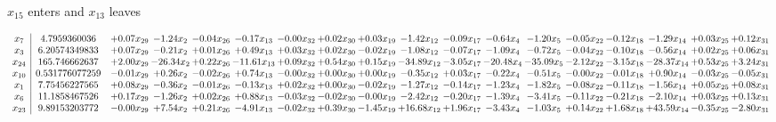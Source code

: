\documentclass[9pt]{article}
\begin{document}
 $ x_{15} $ enters and $ x_{13} $ leaves 

 \[\begin{array}{c| c c@{\hskip 2pt} c@{\hskip 2pt} c@{\hskip 2pt} c@{\hskip 2pt} c@{\hskip 2pt} c@{\hskip 2pt} c@{\hskip 2pt} c@{\hskip 2pt} c@{\hskip 2pt} c@{\hskip 2pt} c@{\hskip 2pt} c@{\hskip 2pt} c@{\hskip 2pt} c@{\hskip 2pt} c@{\hskip 2pt} c@{\hskip 2pt} }
 x_{7}   &  4.7959360036 & +  0.07 x_{29} & -1.24 x_{2} & -0.04 x_{26} & -0.17 x_{13} & -0.00 x_{32} & +  0.02 x_{30} & +  0.03 x_{19} & -1.42 x_{12} & -0.09 x_{17} & -0.64 x_{4} & -1.20 x_{5} & -0.05 x_{22} & -0.12 x_{18} & -1.29 x_{14} & +  0.03 x_{25} & +  0.12 x_{31}\\
 x_{3}   &  6.20574349833 & +  0.07 x_{29} & -0.21 x_{2} & +  0.01 x_{26} & +  0.49 x_{13} & +  0.03 x_{32} & +  0.02 x_{30} & -0.02 x_{19} & -1.08 x_{12} & -0.07 x_{17} & -1.09 x_{4} & -0.72 x_{5} & -0.04 x_{22} & -0.10 x_{18} & -0.56 x_{14} & +  0.02 x_{25} & +  0.06 x_{31}\\
 x_{24}   &  165.746662637 & +  2.00 x_{29} & -26.34 x_{2} & +  0.22 x_{26} & -11.61 x_{13} & +  0.09 x_{32} & +  0.54 x_{30} & +  0.15 x_{19} & -34.89 x_{12} & -3.05 x_{17} & -20.48 x_{4} & -35.09 x_{5} & -2.12 x_{22} & -3.15 x_{18} & -28.37 x_{14} & +  0.53 x_{25} & +  3.24 x_{31}\\
 x_{10}   &  0.531776077259 & -0.01 x_{29} & +  0.26 x_{2} & -0.02 x_{26} & +  0.74 x_{13} & -0.00 x_{32} & +  0.00 x_{30} & +  0.00 x_{19} & -0.35 x_{12} & +  0.03 x_{17} & -0.22 x_{4} & -0.51 x_{5} & -0.00 x_{22} & -0.01 x_{18} & +  0.90 x_{14} & -0.03 x_{25} & -0.05 x_{31}\\
 x_{1}   &  7.75456227565 & +  0.08 x_{29} & -0.36 x_{2} & -0.01 x_{26} & -0.13 x_{13} & +  0.02 x_{32} & +  0.00 x_{30} & -0.02 x_{19} & -1.27 x_{12} & -0.14 x_{17} & -1.23 x_{4} & -1.82 x_{5} & -0.08 x_{22} & -0.11 x_{18} & -1.56 x_{14} & +  0.05 x_{25} & +  0.08 x_{31}\\
 x_{6}   &  11.1858467526 & +  0.17 x_{29} & -1.26 x_{2} & +  0.02 x_{26} & +  0.88 x_{13} & -0.03 x_{32} & -0.02 x_{30} & -0.00 x_{19} & -2.42 x_{12} & -0.20 x_{17} & -1.39 x_{4} & -3.41 x_{5} & -0.11 x_{22} & -0.21 x_{18} & -2.10 x_{14} & +  0.03 x_{25} & +  0.13 x_{31}\\
 x_{23}   &  9.89153203772 & -0.00 x_{29} & +  7.54 x_{2} & +  0.21 x_{26} & -4.91 x_{13} & -0.02 x_{32} & +  0.39 x_{30} & -1.45 x_{19} & + 16.68 x_{12} & +  1.96 x_{17} & -3.43 x_{4} & -1.03 x_{5} & +  0.14 x_{22} & +  1.68 x_{18} & + 43.59 x_{14} & -0.35 x_{25} & -2.80 x_{31}\\

\end{array}\]
\end{document}
